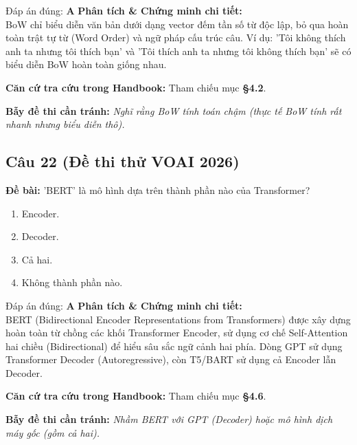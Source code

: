 \documentclass[10pt,a4paper]{article}
\begin{document}
\begin{solbox}{Đáp án đúng: \textbf{A}}
\textbf{Phân tích \& Chứng minh chi tiết:} \\
BoW chỉ biểu diễn văn bản dưới dạng vector đếm tần số từ độc lập, bỏ qua hoàn toàn trật tự từ (Word Order) và ngữ pháp cấu trúc câu. Ví dụ: 'Tôi không thích anh ta nhưng tôi thích bạn' và 'Tôi thích anh ta nhưng tôi không thích bạn' sẽ có biểu diễn BoW hoàn toàn giống nhau.

\vspace{0.4em}
\textbf{Căn cứ tra cứu trong Handbook:} Tham chiếu mục \textbf{§4.2}.

\vspace{0.4em}
\textbf{Bẫy đề thi cần tránh:} \textit{Nghĩ rằng BoW tính toán chậm (thực tế BoW tính rất nhanh nhưng biểu diễn thô).}
\end{solbox}
\vspace{0.5em}


\subsection*{Câu 22 (Đề thi thử VOAI 2026)}
\textbf{Đề bài:} 'BERT' là mô hình dựa trên thành phần nào của Transformer?

\begin{enumerate}[label=\textbf{\Alph*.}]
    \item Encoder.
    \item Decoder.
    \item Cả hai.
    \item Không thành phần nào.
\end{enumerate}

\begin{solbox}{Đáp án đúng: \textbf{A}}
\textbf{Phân tích \& Chứng minh chi tiết:} \\
BERT (Bidirectional Encoder Representations from Transformers) được xây dựng hoàn toàn từ chồng các khối Transformer Encoder, sử dụng cơ chế Self-Attention hai chiều (Bidirectional) để hiểu sâu sắc ngữ cảnh hai phía. Dòng GPT sử dụng Transformer Decoder (Autoregressive), còn T5/BART sử dụng cả Encoder lẫn Decoder.

\vspace{0.4em}
\textbf{Căn cứ tra cứu trong Handbook:} Tham chiếu mục \textbf{§4.6}.

\vspace{0.4em}
\textbf{Bẫy đề thi cần tránh:} \textit{Nhầm BERT với GPT (Decoder) hoặc mô hình dịch máy gốc (gồm cả hai).}
\end{solbox}
\vspace{0.5em}
\end{document}
